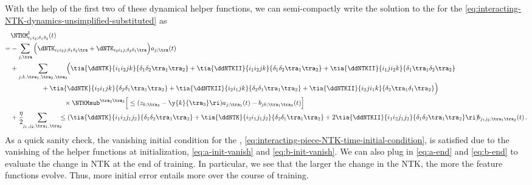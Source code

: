With the help of the first two of these dynamical helper functions, we can semi-compactly write the solution to the  for the  \eqref{eq:interacting-NTK-dynamics-unsimplified-substituted} as
\begin{align}\label{eq:interacting-NTK-solution}
&\NTKM^{\text{I}}_{i_1i_2;\delta_1\delta_2}(t) \, \\
=&-\sum_{j,\tra}\Big(\dNTK_{i_1 i_2j;\delta_1\delta_2\tra}+\dNTK_{i_2 i_1j;\delta_2\delta_1\tra}\Big)
a_{j;\tra}(t)
\, \notag\\
&+ \sum_{j,k,\tra_1,\tra_2,\tra_3}\!\!\Big(
\tia{\ddNTK}{i_1i_2 j k}{\delta_1\delta_2\tra_1\tra_2}+
\tia{\ddNTKII}{i_1i_2 j k}{\delta_1\delta_2\tra_1\tra_2}+
\tia{\ddNTKII}{i_1ji_2  k}{\delta_1\tra_1\delta_2\tra_2}
\, \notag \\
&\qquad\qquad\ \ 
+\tia{\ddNTK}{i_2i_1 j k}{\delta_2\delta_1\tra_1\tra_2}
+\tia{\ddNTKII}{i_2i_1 j k}{\delta_2\delta_1\tra_1\tra_2}
+\tia{\ddNTKII}{i_2ji_1  k}{\delta_2\tra_1\delta_1\tra_2}
\Big) \, \notag \\
&\qquad\qquad\qquad\qquad\times\NTKMsub^{\tra_2\tra_3}\Big[ 
\le( z_{k;\tra_3}-\y{k}{\tra_3} \ri) a_{j;\tra_1}(t) 
-
 b_{jk;\tra_1\tra_3}(t)
\Big]
\, \notag \\
&+\frac{\eta}{2}\!\!\sum_{j_1,j_2,\tra_1,\tra_2}\!\!\!\le(\tia{\ddNTK}{i_1i_2j_1j_2}{\delta_1\delta_2\tra_1\tra_2}+\tia{\ddNTK}{i_2i_1j_1j_2}{\delta_2\delta_1\tra_1\tra_2} + 2\tia{\ddNTKII}{i_1i_2j_1j_2}{\delta_1\delta_2\tra_1\tra_2} \ri)\! b_{j_1j_2;\tra_1\tra_2}(t) \, \notag .
\end{align}
As a quick sanity check, the vanishing initial condition for the ,  \eqref{eq:interacting-piece-NTK-time-initial-condition}, is satisfied due to the vanishing of the helper functions at initialization, \eqref{eq:a-init-vanish} and \eqref{eq:b-init-vanish}.
 We can also plug in \eqref{eq:a-end} and \eqref{eq:b-end} to evaluate the change in NTK at the end of training. In particular, we see that the larger the change in the NTK, the more the feature functions evolve. Thus, more initial error entails more  %
over the course of training. 

